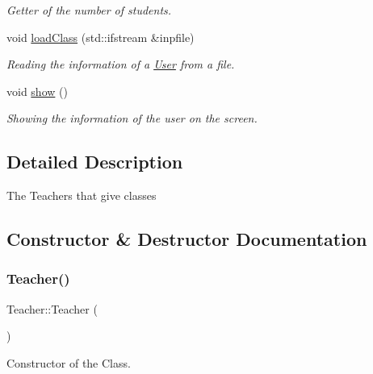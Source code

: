 \begin{DoxyCompactItemize}
\begin{DoxyCompactList}\small\item\em Getter of the number of students. \end{DoxyCompactList}\item 
void \mbox{\hyperlink{class_teacher_a1f204644af41c43ff3bd0582393062fa}{load\+Class}} (std\+::ifstream \&inpfile)
\begin{DoxyCompactList}\small\item\em Reading the information of a \mbox{\hyperlink{class_user}{User}} from a file. \end{DoxyCompactList}\item 
void \mbox{\hyperlink{class_teacher_a3045744c4ef7e1189caac2ae9a126254}{show}} ()
\begin{DoxyCompactList}\small\item\em Showing the information of the user on the screen. \end{DoxyCompactList}\end{DoxyCompactItemize}


\subsection{Detailed Description}
The Teachers that give classes 

\subsection{Constructor \& Destructor Documentation}
\mbox{\label{class_teacher_a0d09b151c46e2abb647a2ae40cc5510c}} 
\subsubsection{\texorpdfstring{Teacher()}{Teacher()}\hspace{0.1cm}{\footnotesize\ttfamily [1/2]}}
{\footnotesize\ttfamily Teacher\+::\+Teacher (\begin{DoxyParamCaption}{ }\end{DoxyParamCaption})}



Constructor of the Class. 

\mbox{\label{class_teacher_adb308468e6ed8bbbffaba9cbf1ae646e}} 

